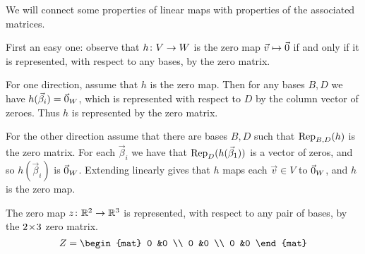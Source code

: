\documentclass[10pt,t]{beamer}
\begin{document}
\begin{frame}
We will connect some properties of linear maps
with properties of the associated matrices.

First an easy one: 
observe that $\map{h}{V}{W}$ is the zero map $\vec{v}\mapsto\zero$
if and only
if it is represented, with respect to any bases, by the zero matrix.

\pause
For one direction, assume that $h$ is the zero map.
Then for any bases $B,D$ we have $h(\vec{\beta}_i)=\zero_W$, which is 
represented with respect to $D$ by the column vector of zeroes.
Thus $h$ is represented by the zero matrix.

\pause
For the other direction 
assume that there are bases $B,D$ such that $\rep{h}{B,D}$ is the zero
matrix.
For each $\vec{\beta}_i$ we have that $\rep{h(\vec{\beta}_1)}{D}$ is a
vector of zeros, and so $h(\vec{\beta}_i)$ is $\zero_W$.
Extending linearly gives that $h$ maps each $\vec{v}\in V$ to $\zero_W$,
and $h$ is the zero map.  

\pause
\ex The zero map $\map{z}{\Re^2}{\Re^3}$ is represented, 
with respect to any pair of bases,
by the $\nbym{2}{3}$
zero matrix.
\begin{equation*}
  Z=
  \begin{mat}
    0 &0 \\
    0 &0 \\
    0 &0
  \end{mat}
\end{equation*}

\end{frame}




\begin{frame}
\th[th:RankMatEqRankMap]
\iftoggle{showallproofs}{
  \pause
  \pf
  \ExecuteMetaData[../map3.tex]{pf:RankMatEqRankMap0}

  \pause
  \ExecuteMetaData[../map3.tex]{pf:RankMatEqRankMap1}
}{

  \bigskip
  The book has the proof.
}
\end{frame}
\iftoggle{showallproofs}{
  \begin{frame}
  \ExecuteMetaData[../map3.tex]{pf:RankMatEqRankMap2}
  \qed
  \end{frame}
}{}
\end{document}
